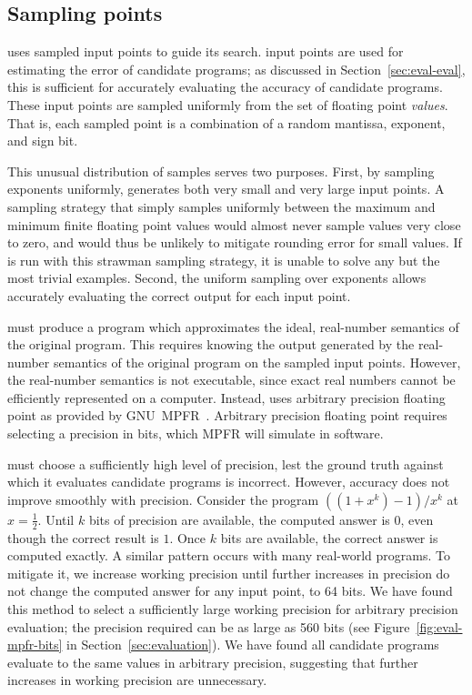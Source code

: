 \documentclass[paper.tex]{subfiles}
\begin{document}
\subsection{Sampling points}

\casio uses sampled input points to guide its search.
\nSample input points are used
  for estimating the error of candidate programs;
  as discussed in Section~\ref{sec:eval-eval},
  this is sufficient for accurately evaluating the accuracy
  of candidate programs.
These input points are sampled uniformly
  from the set of floating point \emph{values}.
That is, each sampled point is a combination of a random
  mantissa, exponent, and sign bit.

This unusual distribution of samples serves two purposes.
First, by sampling exponents uniformly, \casio generates
  both very small and very large input points.
A sampling strategy that simply samples uniformly between
  the maximum and minimum finite floating point values
  would almost never sample values very close to zero,
  and would thus be unlikely to mitigate rounding error for small values.
If \casio is run with this strawman sampling strategy,
  it is unable to solve any but the most trivial examples.
Second, the uniform sampling over exponents allows
  accurately evaluating the correct output for each input point.

\casio must produce a program which approximates
  the ideal, real-number semantics of the original program.
This requires knowing the output generated by
  the real-number semantics of the original program
  on the sampled input points.
However, the real-number semantics is not executable,
  since exact real numbers cannot be efficiently represented on a computer.
Instead, \casio uses arbitrary precision floating point
  as provided by GNU~MPFR~\cite{acm07-mpfr}.
Arbitrary precision floating point requires selecting a precision in bits,
  which MPFR will simulate in software.

\casio must choose a sufficiently high level of precision,
  lest the ground truth against which it evaluates candidate programs is incorrect.
However, accuracy does not improve smoothly with precision.
Consider the program $((1 + x^k) - 1) / x^k$ at $x = \frac12$.
Until $k$ bits of precision are available,
  the computed answer is $0$, even though the correct result is $1$.
Once $k$ bits are available, the correct answer is computed exactly.
A similar pattern occurs with many real-world programs.
To mitigate it, we increase working precision
  until further increases in precision do not change
  the computed answer for any input point, to 64 bits.
We have found this method to select a sufficiently large
  working precision for arbitrary precision evaluation;
  the precision required can be as large as 560 bits
  (see Figure~\ref{fig:eval-mpfr-bits} in Section~\ref{sec:evaluation}).
We have found all candidate programs evaluate
  to the same values in arbitrary precision,
  suggesting that further increases in working precision are unnecessary.
\end{document}
